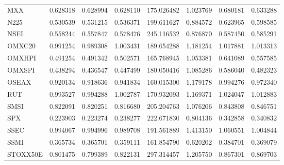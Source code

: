 \begin{longtable}{@{}lrrrrrrr@{}}
MXX & 0.628318 & 0.628994 & 0.628110 & 175.026482 & 1.023769 & 0.680181 & 0.633288 \\
N225 & 0.530539 & 0.531215 & 0.536371 & 199.611627 & 0.884572 & 0.623965 & 0.598585 \\
NSEI & 0.558244 & 0.557847 & 0.578476 & 245.116532 & 0.876870 & 0.587450 & 0.585291 \\
OMXC20 & 0.991254 & 0.989308 & 1.003431 & 189.654288 & 1.181254 & 1.017881 & 1.013313 \\
OMXHPI & 0.491254 & 0.491342 & 0.502571 & 165.768945 & 1.053381 & 0.641089 & 0.557585 \\
OMXSPI & 0.438294 & 0.436547 & 0.447499 & 180.050416 & 1.085286 & 0.586040 & 0.482323 \\
OSEAX & 0.920134 & 0.918636 & 0.941834 & 160.015300 & 1.179178 & 0.994276 & 0.972340 \\
RUT & 0.993527 & 0.994288 & 1.002787 & 170.932093 & 1.169371 & 1.024047 & 1.012883 \\
SMSI & 0.822091 & 0.820251 & 0.816680 & 205.204763 & 1.076206 & 0.843808 & 0.846751 \\
SPX & 0.223903 & 0.223274 & 0.238277 & 222.671830 & 0.804136 & 0.342858 & 0.340832 \\
SSEC & 0.994067 & 0.994996 & 0.989708 & 191.561889 & 1.413150 & 1.060551 & 1.004844 \\
SSMI & 0.365734 & 0.365701 & 0.359111 & 161.854790 & 0.620202 & 0.384701 & 0.369079 \\
STOXX50E & 0.801475 & 0.799389 & 0.822131 & 297.314457 & 1.205750 & 0.867301 & 0.869703 \\
\bottomrule
\end{longtable}\endgroup
